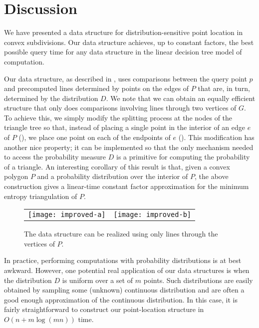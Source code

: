 \documentclass[charterfonts,lotsofwhite]{patmorin}
\begin{document}
\section{Discussion}

We have presented a data structure for distribution-sensitive point
location in convex subdivisions.  Our data structure achieves, up to
constant factors, the best possible query time for any data structure
in the linear decision tree model of computation.  

Our data structure, as described in , uses
comparisons between the query point $p$ and precomputed lines
determined by points on the edges of $P$ that are, in turn, determined
by the distribution $D$.  We note that we can obtain an equally
efficient structure that only does comparisons involving lines through
two vertices of $G$.  To achieve this, we simply modify the splitting
process at the nodes of the triangle tree so that, instead of placing
a single point in the interior of an edge $e$ of $P$ (),
we place one point on each of the endpoints of $e$
(). This modification has another nice
property; it can be implemented so that the only mechanism needed to
access the probability measure $D$ is a primitive for computing the
probability of a triangle.  An interesting corollary of this result is
that, given a convex polygon $P$ and a probability distribution over
the interior of $P$, the above construction gives a linear-time
constant factor approximation for the minimum entropy triangulation of
$P$.

\begin{figure}
\begin{center}\begin{tabular}{cc}
\texttt{[image: improved-a]} & \texttt{[image: improved-b]}
\end{tabular}
\end{center}
\caption{The data structure can be realized using only lines through
the vertices of $P$.}
\end{figure}

In practice, performing computations with probability distributions is
at best awkward.  However, one potential real application of our data
structures is when the distribution $D$ is uniform over a set of $m$
points.  Such distributions are easily obtained by sampling some
(unknown) continuous distribution and are often a good enough
approximation of the continuous distribution.  In this case, it is
fairly straightforward to construct our point-location structure in
$O(n+ m\log(mn))$ time.
\end{document}
